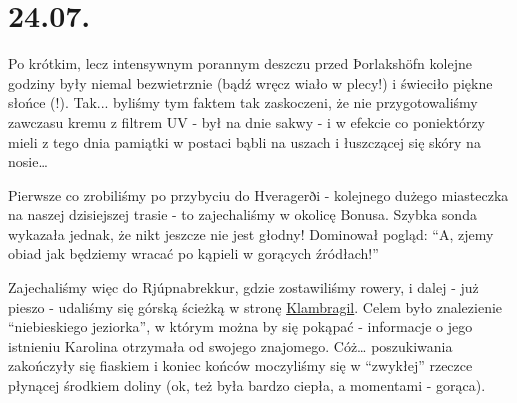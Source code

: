 \chapter{24.07.}

Po krótkim, lecz intensywnym porannym deszczu przed Þorlakshöfn kolejne godziny były niemal bezwietrznie (bądź wręcz wiało w plecy!) i świeciło piękne słońce (!). Tak... byliśmy tym faktem tak zaskoczeni, że nie przygotowaliśmy zawczasu kremu z filtrem UV - był na dnie sakwy - i w efekcie co poniektórzy mieli z tego dnia pamiątki w postaci bąbli na uszach i łuszczącej się skóry na nosie…


Pierwsze co zrobiliśmy po przybyciu do Hveragerði - kolejnego dużego miasteczka na naszej dzisiejszej trasie - to zajechaliśmy w okolicę Bonusa. Szybka sonda wykazała jednak, że nikt jeszcze nie jest głodny! Dominował pogląd: “A, zjemy obiad jak będziemy wracać po kąpieli w gorących źródłach!”

Zajechaliśmy więc do Rjúpnabrekkur, gdzie zostawiliśmy rowery, i dalej - już pieszo - udaliśmy się górską ścieżką w stronę \href{http://www.vulkaner.no/t/isl2004/hot.html}{Klambragil}. Celem było znalezienie “niebieskiego jeziorka”, w którym można by się pokąpać - informacje o jego istnieniu Karolina otrzymała od swojego znajomego. Cóż… poszukiwania zakończyły się fiaskiem i koniec końców moczyliśmy się w “zwykłej” rzeczce płynącej środkiem doliny (ok, też była bardzo ciepła, a momentami - gorąca).



